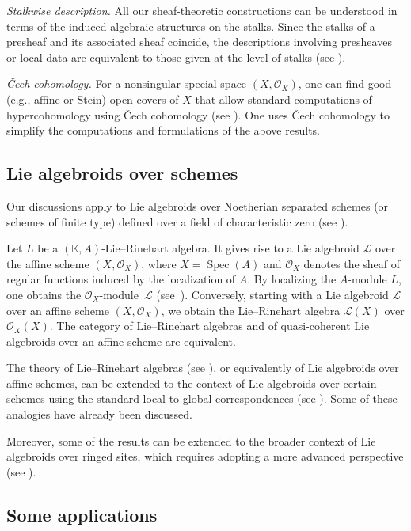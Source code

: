 \documentclass[pdftex]{sigma}
\numberwithin{equation}{section}
\theoremstyle{definition}
\begin{document}
\emph{Stalkwise description.} All our sheaf-theoretic constructions can be understood in terms of the induced algebraic structures on the stalks. Since the stalks of a presheaf and its associated sheaf coincide, the descriptions involving presheaves or local data are equivalent to those given at the level of stalks (see \cite{UB, SR}).

\emph{\v{C}ech cohomology.} For a nonsingular special space $(X, \mathcal{O}_X)$, one can find good (e.g., affine or Stein) open covers of $X$ that allow standard computations of hypercohomology using \v{C}ech cohomology (see \cite{BRT, BP, AS, PT}). One uses \v{C}ech cohomology to simplify the computations and formulations of the above results.

\subsection{Lie algebroids over schemes}
Our discussions apply to Lie algebroids over Noetherian separated schemes (or schemes of finite type) defined over a field of characteristic zero (see \cite{UB, BRT, MK}).

Let $L$ be a $(\mathbb{K}, A)$-Lie--Rinehart algebra. It gives rise to a Lie algebroid $\mathcal{L}$ over the affine scheme $(X, \mathcal{O}_X)$, where $X = \operatorname{Spec}(A)$ and $\mathcal{O}_X$ denotes the sheaf of regular functions induced by the localization of $A$. By localizing the $A$-module $L$, one obtains the $\mathcal{O}_X$-module~$\mathcal{L}$ (see~\cite{CW}).
Conversely, starting with a Lie algebroid $\mathcal{L}$ over an affine scheme $(X, \mathcal{O}_X)$, we obtain the Lie--Rinehart algebra $\mathcal{L}(X)$ over $\mathcal{O}_X(X)$.
The category of Lie--Rinehart algebras and of quasi-coherent Lie algebroids over an affine scheme are equivalent.


The theory of Lie--Rinehart algebras (see \cite{JH, GR}), or equivalently of Lie algebroids over affine schemes, can be extended to the context of Lie algebroids over certain schemes using the standard local-to-global correspondences (see \cite{UB, BRT, MK, HOM, AA}). Some of these analogies have already been discussed.

Moreover, some of the results can be extended to the broader context of Lie algebroids over ringed sites, which requires adopting a more advanced perspective (see \cite{DRV, CV}).

\subsection{Some applications}
\end{document}
